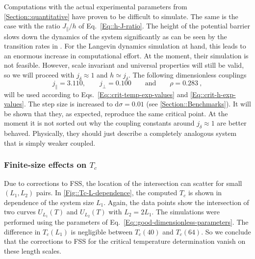 		 Computations with the actual experimental parameters from \autoref{Section::quantitative} have proven to be difficult to simulate. The same is the case with the ratio $J_\parallel / h$ of Eq.~\eqref{Eq::h-J-ratio}. The height of the potential barrier slows down the dynamics of the system significantly as can be seen by the transition rates in \cite{schaller2023sequential}. For the Langevin dynamics simulation at hand, this leads to an enormous increase in computational effort. At the moment, their simulation is not feasible. However, scale invariant and universal properties will still be valid, so we will proceed with $j_\delta \approx 1$ and $h \simeq j_\delta$. The following dimensionless couplings
		 \begin{equation} \label{Eq::good-dimensionless-parameters}
		 	j_\parallel =	3.110, \qquad j_\perp = 0.100 \qquad \text{and} \qquad \rho = 0.283 ~,
		 \end{equation}
	 	will be used according to Eqs.~\eqref{Eq::crit-temp-exp-values} and \eqref{Eq::crit-h-exp-values}. The step size is increased to $\text{d} \sigma =	0.01$ (see \autoref{Section::Benchmarks}). It will be shown that they, as expected, reproduce the same critical point. At the moment it is not sorted out why the coupling constants around $j_\delta \approx 1$ are better behaved. Physically, they should just describe a completely analogous system that is simply weaker coupled.
	\subsubsection{Finite-size effects on ${T_c}$}
	Due to corrections to FSS, the location of the intersection can scatter for small $(L_1, L_2)$ pairs. In \autoref{Fig::Tc-L-dependence}, the computed $T_c$ is shown in dependence of the system size $L_1$. Again, the data points show the intersection of two curves $U_{L_1}(T)$ and $U_{L_2}(T)$ with $L_2 =	2 L_1$. The simulations were performed using the parameters of Eq.~\eqref{Eq::good-dimensionless-parameters}. The difference in $T_c(L_1)$ is negligible between $T_c(40)$ and $T_c(64)$. So we conclude that the corrections to FSS for the critical temperature determination vanish on these length scales.  \\
	
